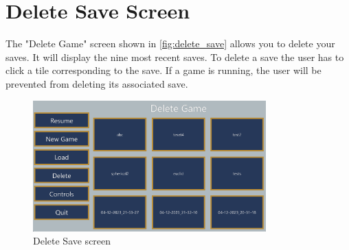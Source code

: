 \section{Delete Save Screen} \label{delete_save_screen}
The "Delete Game" screen shown in \autoref{fig:delete_save} allows you to delete your saves.
It will display the nine most recent saves.
To delete a save the user has to click a tile corresponding to the save.
If a game is running, the user will be prevented from deleting its associated save.

\begin{figure}[!htb]
    \centering
    \includegraphics[width=0.8\textwidth]{chapters/user_manual/resources/delete-game.png}
    \caption{Delete Save screen}
    \label{fig:delete_save}
\end{figure}